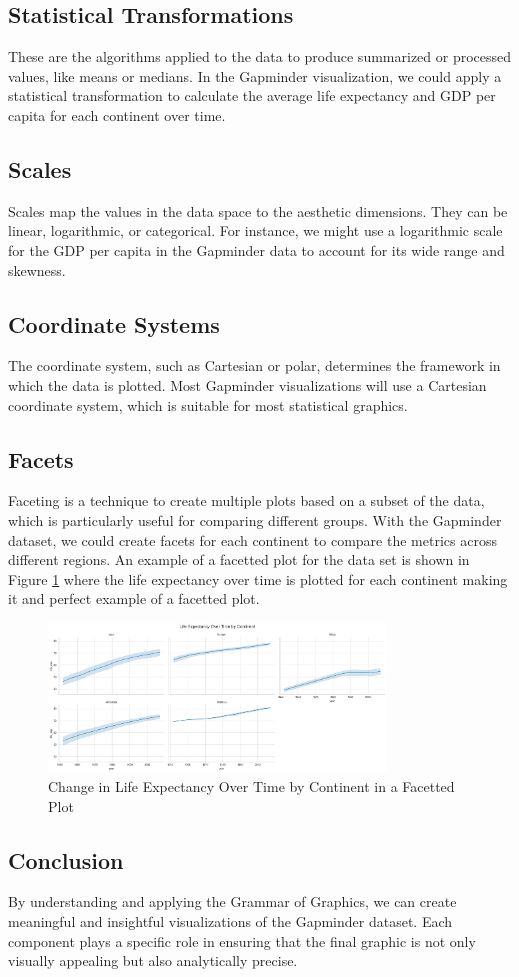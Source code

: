 \subsection{Statistical Transformations}
These are the algorithms applied to the data to produce summarized or processed values, like means or medians. In the Gapminder visualization, we could apply a statistical transformation to calculate the average life expectancy and GDP per capita for each continent over time.

\subsection{Scales}
Scales map the values in the data space to the aesthetic dimensions. They can be linear, logarithmic, or categorical. For instance, we might use a logarithmic scale for the GDP per capita in the Gapminder data to account for its wide range and skewness.

\subsection{Coordinate Systems}
The coordinate system, such as Cartesian or polar, determines the framework in which the data is plotted. Most Gapminder visualizations will use a Cartesian coordinate system, which is suitable for most statistical graphics.

\subsection{Facets}
Faceting is a technique to create multiple plots based on a subset of the data, which is particularly useful for comparing different groups. With the Gapminder dataset, we could create facets for each continent to compare the metrics across different regions.
An example of a facetted plot for the data set is shown in Figure \ref{fig:lo4_facet} where the life expectancy over time is plotted for each continent making it and perfect example of a facetted plot.

\begin{figure}[h]
    \centering
    \includegraphics[width=0.8\textwidth]{images/plots/lo4_life_expectancy_over_time_by_continent.png} 
    \caption{Change in Life Expectancy Over Time by Continent in a Facetted Plot}
    \label{fig:lo4_facet}
\end{figure}

\subsection{Conclusion}
By understanding and applying the Grammar of Graphics, we can create meaningful and insightful visualizations of the Gapminder dataset. Each component plays a specific role in ensuring that the final graphic is not only visually appealing but also analytically precise.